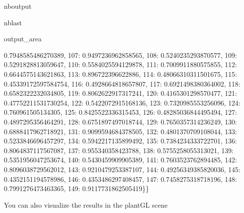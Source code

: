 \documentclass[letterpaper,10pt,english]{sphinxmanual}
\begin{document}
\begin{sphinxuseclass}{nboutput}
\begin{sphinxuseclass}{nblast}
{\begin{sphinxuseclass}{output_area}
\begin{sphinxuseclass}{}
\begin{sphinxVerbatim}[commandchars=\\\{\}]
0.7948585486270389, 107: 0.9497236962858565, 108: 0.5240235293870577, 109: 0.5291828813059647, 110: 0.5584025594129878, 111: 0.7009911880575855, 112: 0.6644575143621863, 113: 0.896722396622886, 114: 0.48066310311501675, 115: 0.45339172597584754, 116: 0.4928664818657807, 117: 0.6921498380364002, 118: 0.6582322232034805, 119: 0.8062622917317241, 120: 0.4165301298570477, 121: 0.47752211531730254, 122: 0.5422072915168136, 123: 0.7320985553256096, 124: 0.760961505134305, 125: 0.8425522336315453, 126: 0.48285036844495494, 127: 0.4897295356464291, 128: 0.6751897497018744, 129: 0.7650357314236249, 130: 0.6888417962718921, 131: 0.9099594684378505, 132: 0.4801370709108044, 133: 0.5233846696457297, 134: 0.5942217135899492, 135: 0.7384234333722701, 136: 0.8064837117567087, 137: 0.955340358423788, 138: 0.5755258055313021, 139: 0.5351956047253674, 140: 0.5430459909905389, 141: 0.7603523762894485, 142: 0.8096038729562012, 143: 0.9210479253387107, 144: 0.49256349385820036, 145: 0.4352151194578986, 146: 0.4353486297408457, 147: 0.7458275318718196, 148: 0.7991276473463365, 149: 0.9117731862505419\}\}
\end{sphinxVerbatim}



\end{sphinxuseclass}
\end{sphinxuseclass}
}

\end{sphinxuseclass}
\end{sphinxuseclass}
\sphinxAtStartPar
You can also visualize the results in the plantGL scene
\end{document}
